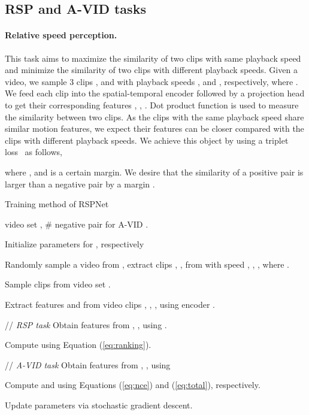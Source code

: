 \documentclass[final]{cvpr}
\begin{document}
\vspace{3mm}
\subsection{RSP and A-VID tasks}
\label{sec:task}



\paragraph{Relative speed perception.} This task aims to maximize the similarity of two clips with same playback speed and minimize the similarity of two clips with different playback speeds. Given a video, we sample 3 clips ,  and  with playback speeds ,  and , respectively, where . We feed each clip into the spatial-temporal encoder  followed by a projection head  to get their corresponding features , , . Dot product function  is used to measure the similarity between two clips. As the clips with the same playback speed share similar motion features, we expect their features can be closer compared with the clips with different playback speeds. We achieve this object by using a triplet loss~\cite{tripletloss} as follows,

where ,  and  is a certain margin. We desire that the similarity of a positive pair is larger than a negative pair by a margin . 




\begin{algorithm}[t] 
	\small
	\caption{Training method of RSPNet}
	\label{algo:training}
	\begin{algorithmic}[1]
		\REQUIRE
		video set , \# negative pair for A-VID .
		
		\STATE Initialize parameters  for , respectively
		
		
		\STATE Randomly sample a video  from , extract clips , ,  from  with speed , , , where .
		
		\STATE Sample  clips  from video set .
		
		\STATE Extract features  and  from video clips  , , ,  using encoder .
		
		\STATE // \emph{RSP task}
		\STATE Obtain features  from , ,  using  .
		
		\STATE Compute  using Equation (\ref{eq:ranking}).
		
		\STATE // \emph{A-VID task}
		\STATE Obtain features  from , ,  using  
		
		\STATE Compute  and  using Equations (\ref{eq:nce}) and (\ref{eq:total}), respectively.
		
		\STATE Update parameters  via stochastic gradient descent.
		
		\ENDWHILE
		
	\end{algorithmic}
\end{algorithm}
\end{document}
